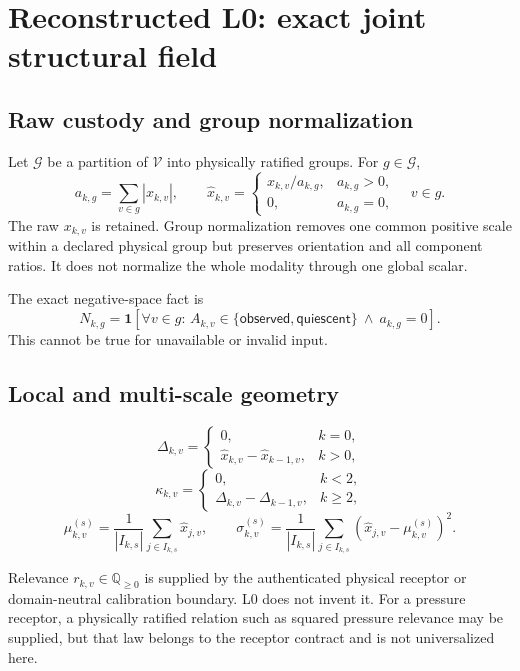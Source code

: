 \documentclass[11pt,oneside]{article}
\newcommand{\Q}{\mathbb{Q}}
\newcommand{\Vertices}{\mathcal{V}}
\newcommand{\Groups}{\mathcal{G}}
\begin{document}
\section{Reconstructed L0: exact joint structural field}

\subsection{Raw custody and group normalization}

Let \(\Groups\) be a partition of \(\Vertices\) into physically ratified
groups. For \(g\in\Groups\),
\[
  a_{k,g}=\sum_{v\in g}|x_{k,v}|,
  \qquad
  \widehat{x}_{k,v}=
  \begin{cases}
    x_{k,v}/a_{k,g},&a_{k,g}>0,\\
    0,&a_{k,g}=0,
  \end{cases}
  \quad v\in g.
\]
The raw \(x_{k,v}\) is retained. Group normalization removes one common
positive scale within a declared physical group but preserves orientation and
all component ratios. It does not normalize the whole modality through one
global scalar.

The exact negative-space fact is
\[
  N_{k,g}=
  \mathbf{1}\!\left[
    \forall v\in g:\,
    A_{k,v}\in\{\mathsf{observed},\mathsf{quiescent}\}
    \ \land\ a_{k,g}=0
  \right].
\]
This cannot be true for unavailable or invalid input.

\subsection{Local and multi-scale geometry}

\[
  \Delta_{k,v}=
  \begin{cases}
    0,&k=0,\\
    \widehat{x}_{k,v}-\widehat{x}_{k-1,v},&k>0,
  \end{cases}
\]
\[
  \kappa_{k,v}=
  \begin{cases}
    0,&k<2,\\
    \Delta_{k,v}-\Delta_{k-1,v},&k\geq2,
  \end{cases}
\]
\[
  \mu^{(s)}_{k,v}
  =\frac{1}{|I_{k,s}|}\sum_{j\in I_{k,s}}\widehat{x}_{j,v},
  \qquad
  \sigma^{(s)}_{k,v}
  =\frac{1}{|I_{k,s}|}
    \sum_{j\in I_{k,s}}
    \left(\widehat{x}_{j,v}-\mu^{(s)}_{k,v}\right)^2.
\]

Relevance \(r_{k,v}\in\Q_{\geq0}\) is supplied by the authenticated physical
receptor or domain-neutral calibration boundary. L0 does not invent it.
For a pressure receptor, a physically ratified relation such as squared
pressure relevance may be supplied, but that law belongs to the receptor
contract and is not universalized here.
\end{document}
